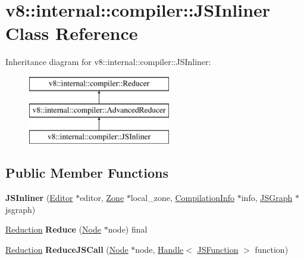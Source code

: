 \hypertarget{classv8_1_1internal_1_1compiler_1_1_j_s_inliner}{}\section{v8\+:\+:internal\+:\+:compiler\+:\+:J\+S\+Inliner Class Reference}
\label{classv8_1_1internal_1_1compiler_1_1_j_s_inliner}
Inheritance diagram for v8\+:\+:internal\+:\+:compiler\+:\+:J\+S\+Inliner\+:\begin{figure}[H]
\begin{center}
\leavevmode
\includegraphics[height=3.000000cm]{classv8_1_1internal_1_1compiler_1_1_j_s_inliner}
\end{center}
\end{figure}
\subsection*{Public Member Functions}
\begin{DoxyCompactItemize}
\item 
{\bfseries J\+S\+Inliner} (\hyperlink{classv8_1_1internal_1_1compiler_1_1_advanced_reducer_1_1_editor}{Editor} $\ast$editor, \hyperlink{classv8_1_1internal_1_1_zone}{Zone} $\ast$local\+\_\+zone, \hyperlink{classv8_1_1internal_1_1_compilation_info}{Compilation\+Info} $\ast$info, \hyperlink{classv8_1_1internal_1_1compiler_1_1_j_s_graph}{J\+S\+Graph} $\ast$jsgraph)\hypertarget{classv8_1_1internal_1_1compiler_1_1_j_s_inliner_a903f843c1ba9b5c9e53da2ba0fefcd8c}{}\label{classv8_1_1internal_1_1compiler_1_1_j_s_inliner_a903f843c1ba9b5c9e53da2ba0fefcd8c}

\item 
\hyperlink{classv8_1_1internal_1_1compiler_1_1_reduction}{Reduction} {\bfseries Reduce} (\hyperlink{classv8_1_1internal_1_1compiler_1_1_node}{Node} $\ast$node) final\hypertarget{classv8_1_1internal_1_1compiler_1_1_j_s_inliner_a2107409713e64e84dc797fa5ca80f910}{}\label{classv8_1_1internal_1_1compiler_1_1_j_s_inliner_a2107409713e64e84dc797fa5ca80f910}

\item 
\hyperlink{classv8_1_1internal_1_1compiler_1_1_reduction}{Reduction} {\bfseries Reduce\+J\+S\+Call} (\hyperlink{classv8_1_1internal_1_1compiler_1_1_node}{Node} $\ast$node, \hyperlink{classv8_1_1internal_1_1_handle}{Handle}$<$ \hyperlink{classv8_1_1internal_1_1_j_s_function}{J\+S\+Function} $>$ function)\hypertarget{classv8_1_1internal_1_1compiler_1_1_j_s_inliner_a82ac079f73db801c17a49d405633b357}{}\label{classv8_1_1internal_1_1compiler_1_1_j_s_inliner_a82ac079f73db801c17a49d405633b357}

\end{DoxyCompactItemize}
